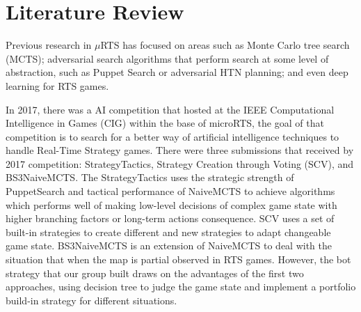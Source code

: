 \section{Literature Review}

Previous research in $\mu$RTS has focused on areas such as Monte Carlo tree search (MCTS);
adversarial search algorithms that perform search at some level of abstraction, such as
Puppet Search or adversarial HTN planning; and even deep learning for RTS games\cite{ontanon2018first}.

In 2017, there was a AI competition that hosted at the IEEE Computational Intelligence in
Games (CIG) within the base of microRTS, the goal of that competition is to search for a
better way of artificial intelligence techniques to handle Real-Time Strategy games.
There were three submissions that received by 2017 competition: StrategyTactics\cite{barriga2017combining},
Strategy Creation through Voting (SCV)\cite{silva2018strategy}, and BS3NaiveMCTS\cite{uriarte2015automatic}.
The StrategyTactics uses the strategic strength of PuppetSearch and tactical performance of NaiveMCTS
to achieve algorithms which performs well of making low-level decisions of complex game state with
higher branching factors or long-term actions consequence. SCV uses a set of built-in
strategies to create different and new strategies to adapt changeable game state. BS3NaiveMCTS
is an extension of NaiveMCTS to deal with the situation that when the map is partial observed
in RTS games. However, the bot strategy that our group built draws on the advantages of the first
two approaches, using decision tree to judge the game state and implement a portfolio build-in
strategy for different situations.
